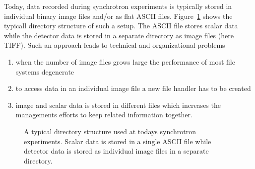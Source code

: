 
Today, data recorded during synchrotron experiments is typically stored in
individual binary image files and/or as flat ASCII files. 
Figure~\ref{fig:nxintro:old_fstree} shows the typicall directory structure of
such a setup. The ASCII file stores scalar data while the detector data is
stored in a separate directory as image files (here TIFF).
Such an approach leads to technical and organizational problems
\begin{enumerate}
\item when the number of image files grows large the performance of most file
systems degenerate 
\item to access data in an individual image file a new file handler has to be
created 
\item image and scalar data is stored in different files which increases the
managements efforts to keep related information together.
\end{enumerate}
\begin{figure}[tb]
    \centering
    \begin{minipage}[c]{0.5\linewidth}
    \centering
    \end{minipage}
    \hfill
    \begin{minipage}[c]{0.48\linewidth}
    \caption{{\small A typical directory structure used at todays synchrotron
    experiments. Scalar data is stored in a single ASCII file while detector
    data is stored as individual image files in a separate directory.}}
    \label{fig:nxintro:old_fstree}
    \end{minipage}
\end{figure}


